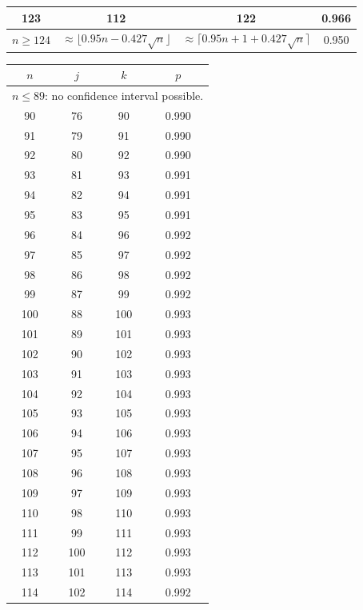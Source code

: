 \begin{table}
\begin{tabular}{|c|c|c|c|}
 123  & 112  & 122 & 0.966  \\ \hline
\hline $n \geq 124$ &
\multicolumn{1}{p{20mm}|}{$\approx \lfloor 0.95 n - 0.427 \sqrt{n}\rfloor$} &
\multicolumn{1}{p{20mm}|}{$\approx \lceil 0.95 n + 1 + 0.427 \sqrt{n}\rceil$} &
0.950 \\ \hline
\end{tabular}
 \hspace{2mm}
\hspace{2mm}
 \begin{tabular}{|c|c|c|c|}
 \hline $n$ & $j$ & $k$ & $p$ \\ \hline \hline
\multicolumn{4}{|c|}{
$n \leq 89 $: no confidence interval possible.}\\ \hline
 90  & 76  & 90 & 0.990  \\ \hline
 91  & 79  & 91 & 0.990  \\ \hline
 92  & 80  & 92 & 0.990  \\ \hline
 93  & 81  & 93 & 0.991  \\ \hline
 94  & 82  & 94 & 0.991  \\ \hline
 95  & 83  & 95 & 0.991  \\ \hline
 96  & 84  & 96 & 0.992  \\ \hline
 97  & 85  & 97 & 0.992  \\ \hline
 98  & 86  & 98 & 0.992  \\ \hline
 99  & 87  & 99 & 0.992  \\ \hline
 100  & 88  & 100 & 0.993  \\ \hline
 101  & 89  & 101 & 0.993  \\ \hline
 102  & 90  & 102 & 0.993  \\ \hline
 103  & 91  & 103 & 0.993  \\ \hline
 104  & 92  & 104 & 0.993  \\ \hline
 105  & 93  & 105 & 0.993  \\ \hline
 106  & 94  & 106 & 0.993  \\ \hline
 107  & 95  & 107 & 0.993  \\ \hline
 108  & 96  & 108 & 0.993  \\ \hline
 109  & 97  & 109 & 0.993  \\ \hline
 110  & 98  & 110 & 0.993  \\ \hline
 111  & 99  & 111 & 0.993  \\ \hline
 112  & 100  & 112 & 0.993  \\ \hline
 113  & 101  & 113 & 0.993  \\ \hline
 114  & 102  & 114 & 0.992  \\ \hline

\end{tabular}
\end{table}
